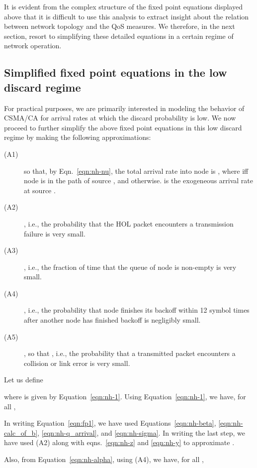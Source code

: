 \documentclass[12pt, draftclsnofoot, onecolumn]{IEEEtran}
\begin{document}
It is evident from the complex structure of the fixed point equations displayed above that it is difficult to use this analysis to extract insight about the relation between network topology and the QoS measures. We therefore, in the next section, resort to simplifying these detailed equations in a certain regime of network operation.

\subsection{Simplified fixed point equations in the low discard regime}
\label{subsec:simplified-analysis}
For practical purposes, we are primarily interested in modeling the behavior of CSMA/CA for arrival rates at which the discard probability is low. We now proceed to further simplify the above fixed point equations in this low discard regime by making the following approximations:

\begin{description}
\item [(A1)]  so that, by Eqn.~\eqref{eqn:nh-nu}, the total arrival rate into node  is , where  iff node  is in the path of source , and  otherwise.  is the exogeneous arrival rate at source . 
\item [(A2)] , i.e., the probability that the HOL packet encounters a transmission failure is very small.
\item [(A3)] , i.e., the fraction of time that the queue of node  is non-empty is very small.
\item [(A4)] , i.e., the probability that node  finishes its backoff within 12 symbol times after another node has finished backoff is negligibly small.
\item [(A5)] , so that , i.e., the probability that a transmitted packet encounters a collision or link error is very small.
\end{description}

Let us define

where  is given by Equation~\eqref{eqn:nh-1}. Using Equation~\eqref{eqn:nh-1}, we have, for all ,


In writing Equation~\eqref{eqn:fp1}, we have used Equations~\eqref{eqn:nh-beta}, \eqref{eqn:nh-calc_of_b}, \eqref{eqn:nh-q_arrival}, and \eqref{eqn:nh-sigma}. In writing the last step, we have used (A2) along with eqns.~\ref{eqn:nh-z} and \ref{eqn:nh-y} to approximate .

Also, from Equation~\eqref{eqn:nh-alpha}, using (A4), we have, for all ,
\end{document}
